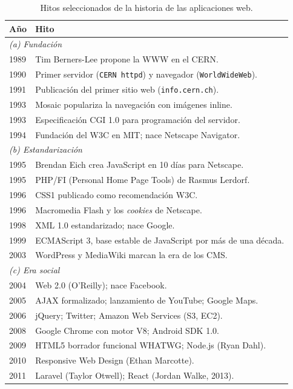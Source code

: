 \documentclass[11pt,a4paper,openany]{book}
\begin{document}
\begin{table}[!htb]
\centering
\caption{Hitos seleccionados de la historia de las aplicaciones web.}
\label{tab:hitos-web}
\footnotesize
\begin{tabularx}{\textwidth}{lX}
\toprule
\textbf{Año} & \textbf{Hito}\\
\midrule
\multicolumn{2}{l}{\emph{(a) Fundación}}\\
1989 & Tim Berners-Lee propone la WWW en el CERN.\\
1990 & Primer servidor (\texttt{CERN httpd}) y navegador (\texttt{WorldWideWeb}).\\
1991 & Publicación del primer sitio web (\texttt{info.cern.ch}).\\
1993 & Mosaic populariza la navegación con imágenes inline.\\
1993 & Especificación CGI 1.0 para programación del servidor.\\
1994 & Fundación del W3C en MIT; nace Netscape Navigator.\\
\midrule
\multicolumn{2}{l}{\emph{(b) Estandarización}}\\
1995 & Brendan Eich crea JavaScript en 10 días para Netscape.\\
1995 & PHP/FI (Personal Home Page Tools) de Rasmus Lerdorf.\\
1996 & CSS1 publicado como recomendación W3C.\\
1996 & Macromedia Flash y los \emph{cookies} de Netscape.\\
1998 & XML 1.0 estandarizado; nace Google.\\
1999 & ECMAScript 3, base estable de JavaScript por más de una década.\\
2003 & WordPress y MediaWiki marcan la era de los CMS.\\
\midrule
\multicolumn{2}{l}{\emph{(c) Era social}}\\
2004 & Web 2.0 (O'Reilly); nace Facebook.\\
2005 & AJAX formalizado; lanzamiento de YouTube; Google Maps.\\
2006 & jQuery; Twitter; Amazon Web Services (S3, EC2).\\
2008 & Google Chrome con motor V8; Android SDK 1.0.\\
2009 & HTML5 borrador funcional WHATWG; Node.js (Ryan Dahl).\\
2010 & Responsive Web Design (Ethan Marcotte).\\
2011 & Laravel (Taylor Otwell); React (Jordan Walke, 2013).\\

\end{tabularx}
\end{table}
\end{document}
